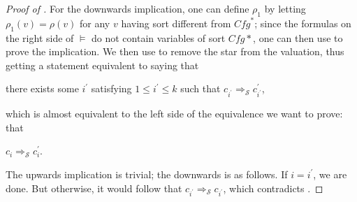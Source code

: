\documentclass{article}
\newenvironment{proofenv}
  {
    \VerbatimEnvironment\begin{tcolorbox}[colback=black!0!white] %
  }
  {
   \end{tcolorbox}
  }
\begin{document}
\begin{proof}[Proof of ]
For the downwards implication, one can define $\rho_1$ by letting $\rho_1(v) = \rho(v)$ for any $v$
having sort different from $\mathit{Cfg}^*$; since the formulas on the right side of $\vDash$ do not contain
variables of sort $\mathit{Cfg}*$, one can then use  to prove the implication.
We then use  to remove the star from the valuation, thus getting a statement
equivalent to saying that
\begin{proofenv}
there exists some $i^\prime$ satisfying $1 \leq i^\prime \leq k$
such that $c_{i^\prime} \Rightarrow_{\mathcal{S}} c^\prime_{i^\prime}$,
\end{proofenv}
which is almost equivalent to the left side of the equivalence we want to prove:
that
\begin{proofenv}
$c_{i} \Rightarrow_{\mathcal{S}} c^\prime_{i}$.
\end{proofenv}
The upwards implication is trivial; the downwards is as follows. If $i = i^\prime$, we are done.
But otherwise, it would follow that $c_{i^\prime} \Rightarrow_{\mathcal{S}} c_{i^\prime}$,
which contradicts .
\end{proof}
\end{document}
